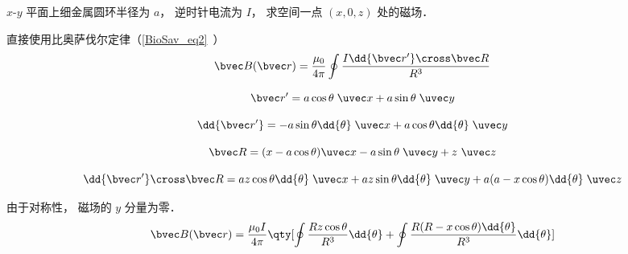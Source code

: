 
\begin{issues}
\issueDraft
\end{issues}


$x$-$y$ 平面上细金属圆环半径为 $a$， 逆时针电流为 $I$， 求空间一点 $(x, 0, z)$ 处的磁场．

直接使用比奥萨伐尔定律（\autoref{BioSav_eq2}~）
\begin{equation}
\bvec B(\bvec r) = \frac{\mu_0}{4\pi} \oint \frac{I \dd{\bvec r'} \cross \bvec R}{R^3}
\end{equation}

\begin{equation}
\bvec r' = a\cos\theta\; \uvec x + a\sin\theta\; \uvec y
\end{equation}

\begin{equation}
\dd{\bvec r'} = -a\sin \theta \dd{\theta}\; \uvec x + a\cos \theta \dd{\theta}\; \uvec y
\end{equation}

\begin{equation}
\bvec R = (x - a\cos\theta)\uvec x - a\sin\theta \;\uvec y+ z\ \uvec z
\end{equation}

\begin{equation}
\dd{\bvec r'} \cross \bvec R = az \cos\theta \dd{\theta} \;\uvec x + az\sin\theta \dd{\theta} \;\uvec y + a(a - x\cos\theta)\dd{\theta}\;\uvec z
\end{equation}

由于对称性， 磁场的 $y$ 分量为零．
\begin{equation}
\bvec B(\bvec r) = \frac{\mu_0 I}{4\pi} \qty[\oint \frac{Rz \cos\theta}{R^3} \dd{\theta} + \oint \frac{R(R - x\cos\theta)\dd{\theta}}{R^3} \dd{\theta}]
\end{equation}

